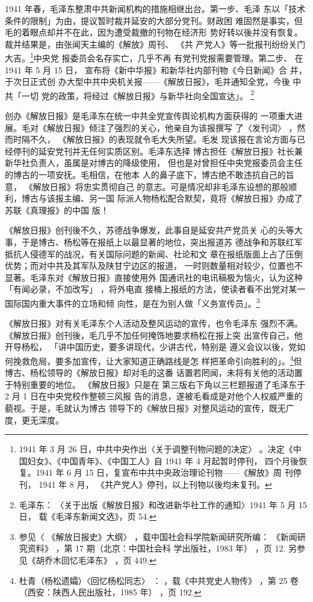 1941 年春，毛泽东整肃中共新闻机构的措施相继出台。第一步、毛泽 东以「技术
条件的限制」为由，提议暂时裁并延安的大部分党刊。财政困 难固然是事实，但
毛的着眼点却并不在此，因为遭受裁撤的刊物在经济形 势好转以後并没有恢复。
裁并结果是，由张闻天主编的《解放》周刊、 《共 产党人》等一批报刊纷纷关门
大吉。\footnote{1941 年 3 月 26 日，中共中央作出〈关于调整刊物问题的决定〉
。决定《中国妇女》、《中国青年》、《中国工人》自 1941 年 4 月起暂时停刊，
四个月後恢复。1941 年 6 月 15 日，复宣布中共中央政治理论刊物——《解放》周
刊停刊， 1941 年 8 月， 《共产党人》停刊，以上刊物以後均未复刊。}中央党
报委员会名存实亡，几乎不再 有党刊党报需要管理。第二步、
在 1941 年 5 月 15 日， 宣布将《新中华报》和新华社内部刊物《今日新闻》合
并，于次日正式创 办大型中共中央机关报——《解放日报》，毛并通知全党，今後
中共「一切 党的政策，将经过《解放日报》与新华社向全国宣达」。
\footnote{毛泽东：
〈关于出版《解放日报》和改进新华社工作的通知〉1941 年 5 月 15 日，
载《毛泽东新闻文选》，页 54.} 


创办《解放日报》是毛泽东在统一中共全党宣传舆论机构方面获得的
一项重大进展。毛对《解放日报》倾注了强烈的关心，他亲自为该报撰写
了〈发刊词〉
，然而时隔不久，
《解放日报》的表现就令毛大失所望。毛发
现该报在言论方面与已经停刊的延安党刊并无任何实质区别。毛泽东选择
博古担任《解放日报》社长兼新华社负责人，虽属是对博古的降级使用，
但也是对曾担任中央党报委员会主任的博古的一项安抚。毛相信，在他本
人的鼻子底下，博古绝不敢违抗自己的旨意，
《解放日报》将忠实贯彻自己
的意志。可是情况却非毛泽东设想的那般顺利，博古与该报主编、另一国
际派人物杨松配合默契，竟将《解放日报》办成了苏联《真理报》的中国
版！

《解放日报》创刊後不久，苏德战争爆发，此事自是延安共产党员关
心的头等大事，于是博古、杨松等在报纸上以最显著的地位，突出报道苏
德战争和苏联红军抵抗人侵德军的战况，有关国际问题的新闻、社论和文
章在报纸版面上占了压倒优势；而对中共及其军队及陕甘宁边区的报道，
一时则数量相对较少，位置也不显著。毛泽东对《解放日报》直接使用外
国通讯社的电讯稿极为恼火，认为这种「有闻必录，不加改写」
，将外电直
接桶上报纸的方法，使读者看不出党对某一国际国内重大事件的立场和倾
向性，是在为别人做「义务宣传员」。\footnote{参见〈
《解放日报史》大纲〉
，载中国社会科学院新闻研究所编：
《新闻研究资料》
，第 17 期（北京：中国社会科
学出版社，1983 年）
，页 12. 另参见《胡乔木回忆毛泽东》
，页 449.} 

《解放日报》对有关毛泽东个人活动及整风运动的宣传，也令毛泽东
强烈不满。
《解放日报》创刊後，毛几乎不加任何掩饰地要求杨松在报上突
出宣传自己，他开导杨松，
「讲中国历史，要多讲现代，少讲古代，特别是
遵义会议以後，党如何挽救危局，要多加宣传，让大家知道正确路线是怎
样把革命引向胜利的」。\footnote{杜青（杨松遗孀）〈回忆杨松同志〉
：
，载《中共党史人物传》
，第 25 卷（西安：陕西人民出版社，1985 年）
，页
192.}但博古、杨松领导的《解放日报》却对毛的这番
话置若罔闻，未将有关他的活动置于特别重要的地位。
《解放日报》只是在
第三版右下角以三栏题报道了毛泽东于 2 月 1 日在中央党校作整顿三风报
告的消息，遂被毛看成是对他个人权威严重的藐视。于是，毛就认为博古
领导下的《解放日报》对整风运动的宣传，既无广度，更无深度。

